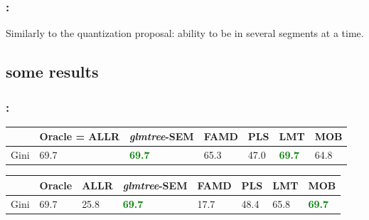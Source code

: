 \documentclass[english,xcolor={rgb,dvipsnames,table,usenames}]{beamer}
\DeclareMathOperator*{\argmax}{\arg\!\max}
\begin{document}
\begin{frame}
\frametitle{\secname: \subsecname}

Similarly to the quantization proposal: ability to be in several segments at a time.

\medskip


\medskip


\medskip

\uncover<4->{
\[ \bm{\theta}^{c(s+1)} = \argmax_{\bm{\theta}^c} \sum_{i=1}^n \mathds{1}_{c}(c_i^{s+1)}) \ln p_{\bm{\theta}^c}(y_i | \bm{x}_i ; c_i). \]
}

\medskip


\end{frame}

\subsection{some results}

\begin{frame}
\frametitle{\secname: \subsecname}

\begin{table}[t]
\centering
\begin{tabular}{ll|lllll}
 & Oracle = ALLR & \textit{glmtree}-SEM & FAMD & PLS & LMT & MOB \\
\hline
Gini & 69.7 & \textcolor{green}{\textbf{69.7}} & 65.3 & 47.0 & \textcolor{green}{\textbf{69.7}} & 64.8 \\
\end{tabular}
\end{table}

\bigskip

\begin{table}[t]
\centering
\begin{tabular}{ll|llllll}
 & Oracle & ALLR & \textit{glmtree}-SEM & FAMD & PLS & LMT & MOB \\
\hline
Gini & 69.7 & 25.8 & \textcolor{green}{\textbf{69.7}} & 17.7 & 48.4 & 65.8 & \textcolor{green}{\textbf{69.7}} \\
\end{tabular}
\end{table}

\end{frame}
\end{document}
